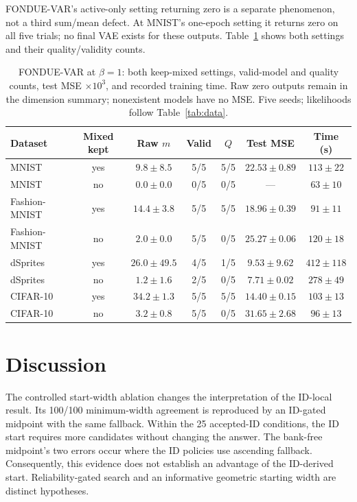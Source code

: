 \documentclass[make,article,submit,pdftex,moreauthors]{Definitions/mdpi}
\begin{document}
FONDUE-VAR's active-only setting returning zero is a separate phenomenon,
not a third sum/mean defect. At MNIST's one-epoch setting it returns zero
on all five trials; no final VAE exists for these outputs.
Table~\ref{tab:var} shows both settings and their quality/validity counts.

\begin{table}[H]
\caption{FONDUE-VAR at $\beta=1$: both keep-mixed settings, valid-model and quality counts, test MSE $\times10^3$, and recorded training time. Raw zero outputs remain in the dimension summary; nonexistent models have no MSE. Five seeds; likelihoods follow Table~\ref{tab:data}.}\label{tab:var}
\footnotesize
\setlength{\tabcolsep}{3.5pt}
\begin{tabular*}{\textwidth}{@{\extracolsep{\fill}}lcccccc@{}}
\toprule
Dataset & Mixed kept & Raw $m$ & Valid & $Q$ & Test MSE & Time (s) \\
\midrule
MNIST & yes & $9.8 \pm 8.5$ & 5/5 & 5/5 & $22.53 \pm 0.89$ & $113 \pm 22$ \\
MNIST & no & $0.0 \pm 0.0$ & 0/5 & 0/5 & --- & $63 \pm 10$ \\
Fashion-MNIST & yes & $14.4 \pm 3.8$ & 5/5 & 5/5 & $18.96 \pm 0.39$ & $91 \pm 11$ \\
Fashion-MNIST & no & $2.0 \pm 0.0$ & 5/5 & 0/5 & $25.27 \pm 0.06$ & $120 \pm 18$ \\
dSprites & yes & $26.0 \pm 49.5$ & 4/5 & 1/5 & $9.53 \pm 9.62$ & $412 \pm 118$ \\
dSprites & no & $1.2 \pm 1.6$ & 2/5 & 0/5 & $7.71 \pm 0.02$ & $278 \pm 49$ \\
CIFAR-10 & yes & $34.2 \pm 1.3$ & 5/5 & 5/5 & $14.40 \pm 0.15$ & $103 \pm 13$ \\
CIFAR-10 & no & $3.2 \pm 0.8$ & 5/5 & 0/5 & $31.65 \pm 2.68$ & $96 \pm 13$ \\
\bottomrule
\end{tabular*}
\end{table}


\section{Discussion}\label{sec:discussion}
The controlled start-width ablation changes the interpretation of the
ID-local result. Its 100/100 minimum-width agreement is reproduced by
an ID-gated midpoint with the same fallback. Within the 25 accepted-ID
conditions, the ID start requires more candidates without changing the
answer. The bank-free midpoint's two errors occur where the ID policies
use ascending fallback. Consequently, this evidence does not establish
an advantage of the ID-derived start. Reliability-gated search and an
informative geometric starting width are distinct hypotheses.
\end{document}
